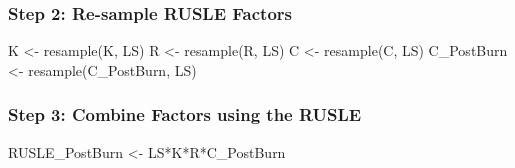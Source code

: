 \documentclass[
]{article}
\newenvironment{Shaded}{\begin{snugshade}}{\end{snugshade}}
\newcommand{\FunctionTok}[1]{\textcolor[rgb]{0.00,0.00,0.00}{#1}}
\newcommand{\NormalTok}[1]{#1}
\newcommand{\OtherTok}[1]{\textcolor[rgb]{0.56,0.35,0.01}{#1}}
\newcommand{\SpecialCharTok}[1]{\textcolor[rgb]{0.00,0.00,0.00}{#1}}
\begin{document}
\hypertarget{sec-step-3-resample-rusle-factors}{%
\subsubsection*{Step 2: Re-sample RUSLE Factors}\label{sec-step-3-resample-rusle-factors}}

\begin{Shaded}
\begin{Highlighting}[]
\NormalTok{K }\OtherTok{\textless{}{-}}  \FunctionTok{resample}\NormalTok{(K, LS)}
\NormalTok{R }\OtherTok{\textless{}{-}}  \FunctionTok{resample}\NormalTok{(R, LS)}
\NormalTok{C }\OtherTok{\textless{}{-}}  \FunctionTok{resample}\NormalTok{(C, LS)}
\NormalTok{C\_PostBurn }\OtherTok{\textless{}{-}}  \FunctionTok{resample}\NormalTok{(C\_PostBurn, LS)}
\end{Highlighting}
\end{Shaded}

\hypertarget{sec-step-4-combine-factors-using-the-rusle-post}{%
\subsubsection*{Step 3: Combine Factors using the RUSLE}\label{sec-step-4-combine-factors-using-the-rusle-post}}

\begin{Shaded}
\begin{Highlighting}[]
\NormalTok{RUSLE\_PostBurn }\OtherTok{\textless{}{-}}\NormalTok{ LS}\SpecialCharTok{*}\NormalTok{K}\SpecialCharTok{*}\NormalTok{R}\SpecialCharTok{*}\NormalTok{C\_PostBurn}
\end{Highlighting}
\end{Shaded}
\end{document}

